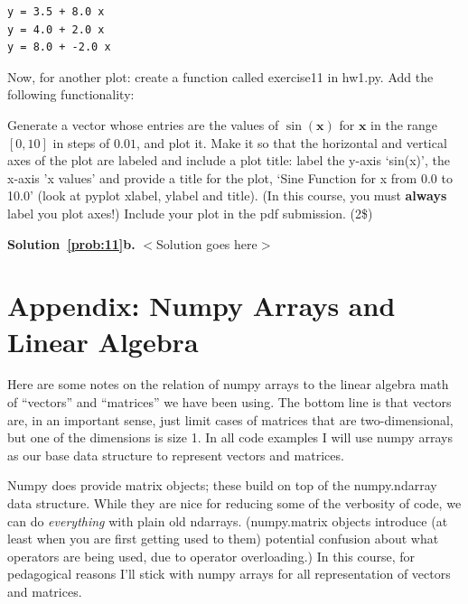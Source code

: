 \documentclass[10pt]{article}
\begin{document}
\begin{enumerate}
\begin{figure}
\end{figure}

\begin{verbatim}
y = 3.5 + 8.0 x
y = 4.0 + 2.0 x
y = 8.0 + -2.0 x
\end{verbatim}

Now, for another plot: create a function called exercise11 in hw1.py.  Add the following functionality:

Generate a vector whose entries are the values of $\sin(\mathbf{x})$ for $\mathbf{x}$ in the range $[0,10]$ in steps of $0.01$, and plot it.  Make it so that the horizontal and vertical axes of the plot are labeled and include a plot title: label the y-axis `sin(x)', the x-axis 'x values' and provide a title for the plot, `Sine Function for x from 0.0 to 10.0' (look at pyplot xlabel, ylabel and title).  (In this course, you must {\bf always} label you plot axes!)  Include your plot in the pdf submission. (2\$)

{\bf Solution~\ref{prob:11}b.} $<$Solution goes here$>$\\

\end{enumerate}


\newpage

\section*{Appendix: Numpy Arrays and Linear Algebra}

Here are some notes on the relation of numpy arrays to the linear algebra math of ``vectors'' and ``matrices'' we have been using.  The bottom line is that vectors are, in an important sense, just limit cases of matrices that are two-dimensional, but one of the dimensions is size 1.  In all code examples I will use numpy arrays as our base data structure to represent vectors and matrices.

Numpy does provide matrix objects; these build on top of the numpy.ndarray data structure.  While they are nice for reducing some of the verbosity of code, we can do {\em everything} with plain old ndarrays.  (numpy.matrix objects introduce (at least when you are first getting used to them) potential confusion about what operators are being used, due to operator overloading.)  In this course, for pedagogical reasons I'll stick with numpy arrays for all representation of vectors and matrices.
\end{document}

